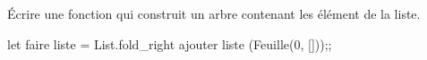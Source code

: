 \begin{question}{}{}
Écrire une fonction  qui construit un arbre contenant les élément de la liste. 
\reponse
\begin{ocaml}
let faire liste = 
   List.fold_right ajouter liste (Feuille(0, []));;
\end{ocaml}
\end{question}
